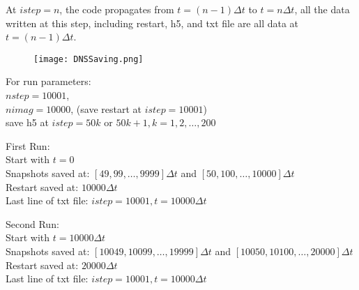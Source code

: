 \documentclass[titlepage,12pt,letter]{article}
\numberwithin{equation}{section}
\begin{document}
At $istep = n$, the code propagates from $t = (n-1)\Delta t$ to $t = n \Delta t$, all the data written at this step, including restart, h5, and txt file are all data at $t = (n-1)\Delta t$. 

\begin{figure}[H]
	\centering
	\texttt{[image: DNSSaving.png]}
\end{figure}
\newpage
For run parameters:\\
$nstep = 10001$,\\
$nimag = 10000$, (save restart at $istep = 10001$)\\
save h5 at $istep = 50k \text{ or } 50k+1, k = 1,2,\dots,200$

First Run:\\
Start with $t = 0$\\
Snapshots saved at: $[49, 99, \dots, 9999] \Delta t$ and $[50, 100, \dots, 10000] \Delta t$\\
Restart saved at: $10000\Delta t$\\
Last line of txt file: $istep = 10001, t = 10000\Delta t$

Second Run:\\
Start with $t = 10000\Delta t$\\
Snapshots saved at: $[10049, 10099, \dots, 19999] \Delta t$ and  $[10050, 10100, \dots, 20000] \Delta t$\\
Restart saved at: $20000\Delta t$\\
Last line of txt file: $istep = 10001, t = 10000\Delta t$
\end{document}
